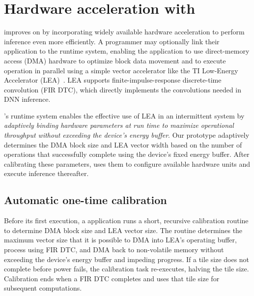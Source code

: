 \section{Hardware acceleration with \tails}
\label{sonic:tails}

\tails improves on \sonic by incorporating widely available hardware acceleration
to perform inference even more efficiently.
%
A programmer may optionally link their \sonic application to the \tails runtime
system, enabling the application to use direct-memory access (DMA) hardware to
optimize block data movement and to execute operation in parallel using a
simple vector accelerator like the TI Low-Energy Accelerator
(LEA)~\cite{lea}.
LEA supports finite-impulse-response discrete-time convolution (FIR
DTC), which directly implements the convolutions needed in DNN inference.

\tails's runtime system enables the effective use of LEA in an intermittent
system by \emph{adaptively binding
hardware parameters at run time to maximize operational throughput without
exceeding the device's energy buffer}.
%
Our \tails prototype adaptively determines the DMA block size and LEA vector
width based on the number of operations that successfully complete using the
device's fixed energy buffer.
%
After calibrating these parameters, \tails uses them to configure available
hardware units and execute inference thereafter. 

\subsection{Automatic one-time calibration}
Before its first execution, a \tails application runs a
short, recursive calibration routine to determine DMA
block size and LEA vector size.  The routine determines the
maximum vector size that it is possible to DMA into LEA's operating buffer,
process using FIR DTC, and DMA back to non-volatile memory without
exceeding the device's energy buffer and impeding progress.  
%
If a tile size does not complete before power fails, the calibration task re-executes, 
halving the tile size. 
Calibration ends when a FIR DTC completes and \tails uses that tile size for subsequent computations.

